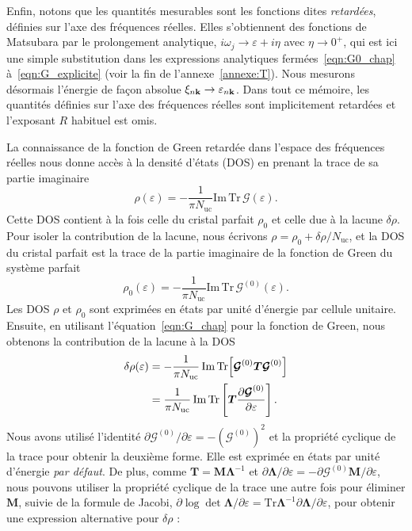 Enfin, notons que les quantités mesurables sont les fonctions dites \textit{retardées}, définies sur l'axe des fréquences réelles. Elles s'obtiennent des fonctions de Matsubara par le prolongement analytique, $i\omega_j \to \varepsilon + i\eta$ avec $\eta \to 0^+$, qui est ici une simple substitution dans les expressions analytiques fermées~\eqref{eqn:G0_chap} à~\eqref{eqn:G_explicite} (voir la fin de l'annexe~\ref{annexe:T}). Nous mesurons désormais l'énergie de façon absolue $\xi_{n\mathbf{k}}\to\varepsilon_{n\mathbf{k}}$. Dans tout ce mémoire, les quantités définies sur l'axe des fréquences réelles sont implicitement retardées et l'exposant $R$ habituel est omis.

\bigskip
{}

La connaissance de la fonction de Green retardée dans l'espace des fréquences réelles nous donne accès à la densité d'états (DOS) en prenant la trace de sa partie imaginaire
\begin{equation}
    \rho(\varepsilon) = -\frac{1}{\pi N_\text{uc}}\mathrm{Im}\,\mathrm{Tr}\,\bm{\mathcal{G}}(\varepsilon).\label{eqn:rho}
\end{equation}
Cette DOS contient à la fois celle du cristal parfait $\rho_0$ et celle due à la lacune $\delta \rho$. Pour isoler la contribution de la lacune, nous écrivons $\rho=\rho_0+\delta\rho/N_\text{uc}$, et la DOS du cristal parfait est la trace de la partie imaginaire de la fonction de Green du système parfait
\begin{equation}
    \rho_0(\varepsilon) = -\frac{1}{\pi N_\text{uc}}\mathrm{Im}\,\mathrm{Tr}\,\bm{\mathcal{G}}^{(0)}(\varepsilon).\label{eqn:rho_0}
\end{equation}
Les DOS $\rho$ et $\rho_0$ sont exprimées en états par unité d'énergie par cellule unitaire. Ensuite, en utilisant l'équation~\eqref{eqn:G_chap} pour la fonction de Green, nous obtenons la contribution de la lacune à la DOS
\begin{align}
    \delta\rho(\varepsilon) &= -\frac{1}{\pi N_\text{uc}}\,\mathrm{Im}\,\mathrm{Tr}\!\left[\bm{\mathcal{G}}^{(0)}\bm T\bm{\mathcal{G}}^{(0)}\right]\notag\\
    &= \frac{1}{\pi N_\text{uc}}\,\mathrm{Im}\,\mathrm{Tr}\left[\bm T\frac{\partial\bm{\mathcal{G}}^{(0)}}{\partial\varepsilon}\right].\label{eqn:delta_rho}
\end{align}
Nous avons utilisé l'identité $\partial\bm{\mathcal{G}}^{(0)}/\partial \varepsilon = -\left(\bm{\mathcal{G}}^{(0)}\right)^2$ et la propriété cyclique de la trace pour obtenir la deuxième forme. Elle est exprimée en états par unité d'énergie \textit{par défaut}. De plus, comme $\bm T=\bm M\bm\Lambda^{-1}$ et $\partial\bm\Lambda/\partial\varepsilon = -\partial\bm{\mathcal{G}}^{(0)}\bm M/\partial\varepsilon$, nous pouvons utiliser la propriété cyclique de la trace une autre fois pour éliminer $\bm M$, suivie de la formule de Jacobi, $\partial\log\det\bm\Lambda/\partial\varepsilon = \mathrm{Tr}\bm\Lambda^{-1}\partial\bm\Lambda/\partial\varepsilon$, pour obtenir une expression alternative pour $\delta\rho$ :
